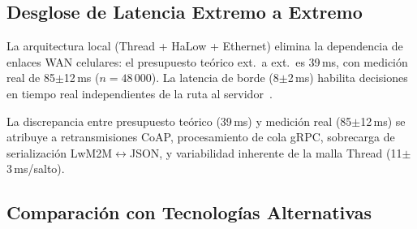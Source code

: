 \subsection{Desglose de Latencia Extremo a Extremo}
\label{sec:resultados-latencia-breakdown}

\begin{table}[H]
\centering
\caption{Desglose de latencia ext. a ext. por segmento de la arquitectura}
\label{tab:latencia-e2e-breakdown}
\end{table}

La arquitectura local (Thread + HaLow + Ethernet) elimina la dependencia de enlaces WAN celulares: el presupuesto teórico ext.\ a ext.\ es 39\,ms, con medición real de 85$\pm$12\,ms ($n=48\,000$). La latencia de borde (8$\pm$2\,ms) habilita decisiones en tiempo real independientes de la ruta al servidor~\cite{minhEdgeComputingIoTEnabled2022}.

La discrepancia entre presupuesto teórico (39\,ms) y medición real (85$\pm$12\,ms) se atribuye a retransmisiones CoAP, procesamiento de cola gRPC, sobrecarga de serialización LwM2M$\leftrightarrow$JSON, y variabilidad inherente de la malla Thread (11$\pm$3\,ms/salto).

\subsection{Comparación con Tecnologías Alternativas}
\label{sec:resultados-latencia-tecnologias}

